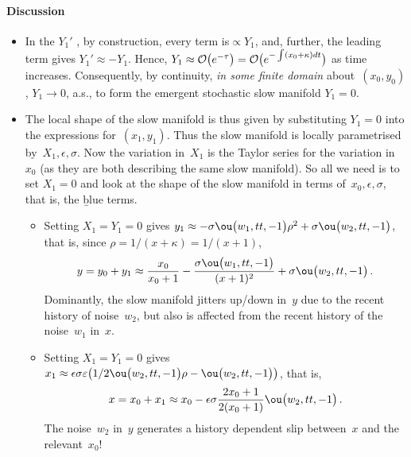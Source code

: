 \paragraph{Discussion}
\begin{itemize}
\item In the \(Y_1'\) \sde, by construction, every term
is\({}\propto Y_1\), and, further, the leading term gives
\(Y_1' \approx -Y_1\). Hence,
\(Y_1 \approx \Ord{e^{-\tau}} =\Ord{e^{-\int(x_0+\kappa)dt}}\)
as time increases. Consequently, by continuity, \emph{in
some finite domain} about~\((x_0,y_0)\), \(Y_1\to 0\), a.s., to
form the emergent stochastic slow manifold \(Y_1=0\).

\item The local shape of the slow manifold is thus given by
substituting \(Y_1=0\) into the expressions
for~\((x_1,y_1)\). Thus the slow manifold is locally
parametrised by~\(X_1,\epsilon,\sigma\). Now the variation
in~\(X_1\) is the Taylor series for the variation in~\(x_0\)
(as they are both describing the same slow manifold). So all
we need is to set \(X_1=0\) and look at the shape of the
slow manifold in terms of~\(x_0,\epsilon,\sigma\), that is,
the \b{blue terms}.
\begin{itemize}

\item Setting \(X_1=Y_1=0\) gives \(y_1\approx
-\sigma \ou\big(w_{1},tt,-1\big) \rho ^{2} +\sigma 
\ou\big(w_{2},tt,-1\big)\), that is, since
$\rho=1/(x+\kappa)=1/(x+1)$,
\begin{equation*}
y=y_0+y_1\approx \frac{x_0}{x_0+1}
-\frac{\sigma\ou\big(w_{1},tt,-1\big)}{ (x+1) ^{2}} 
+\sigma  \ou\big(w_{2},tt,-1\big)\,.
\end{equation*}
Dominantly, the slow manifold jitters up/down in~\(y\) due
to the recent history of noise~\(w_2\), but also is affected
from the recent history of the noise~\(w_1\) in~\(x\). 

\item Setting \(X_1=Y_1=0\) gives \(x_1\approx\epsilon 
\sigma  \varepsilon  \big( 1/2 \ou\big(w_{2},tt,-1\big) \rho
-\ou\big(w_{2},tt,-1\big) \big)\), that is, 
\begin{equation*}
x=x_0+x_1 \approx x_0-\epsilon  \sigma   \frac{2x_0+1}{2(x_0+1)}\ou\big(w_{2},tt,-1\big)\,.
\end{equation*}
The noise~\(w_2\) in~\(y\) generates a history dependent
slip between~\(x\) and the relevant~\(x_0\)!  


\end{itemize}
\end{itemize}

